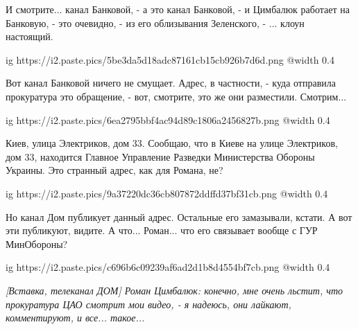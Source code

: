 \begin{multicols}{2}
И смотрите... канал Банковой, - а это канал Банковой, - и Цимбалюк работает на Банковую, - это очевидно, - 
из его облизывания Зеленского, - ... клоун настоящий. 

\ifcmt
  ig https://i2.paste.pics/5be3da5d18adc87161cb15cb926b7d6d.png
  @width 0.4
\fi

Вот канал Банковой ничего не смущает. Адрес, в частности, - куда отправила прокуратура
это обращение, - вот, смотрите, это же они разместили. Смотрим... 

\ifcmt
  ig https://i2.paste.pics/6ea2795bbf4ac94d89c1806a2456827b.png
  @width 0.4
\fi

Киев, улица Электриков, дом 33. Сообщаю, что в Киеве на улице Электриков, дом
33, находится Главное Управление Разведки Министерства Обороны Украины. Это
странный адрес, как для Романа, не? 

\ifcmt
  ig https://i2.paste.pics/9a37220dc36cb807872ddffd37bf31cb.png
  @width 0.4
\fi

Но канал Дом публикует данный адрес. Остальные его замазывали, кстати. А вот эти публикуют, видите.
А что... Роман... что его связывает вообще с ГУР МинОбороны? 

\ifcmt
  ig https://i2.paste.pics/c696b6c09239af6ad2d1b8d4554bf7cb.png
  @width 0.4
\fi

{\em\color{blue}
[Вставка, телеканал ДОМ]
Роман Цимбалюк: конечно, мне очень льстит, что прокуратура ЦАО смотрит мои видео, - 
я надеюсь, они лайкают, комментируют, и все... такое...
}


\end{multicols} %
